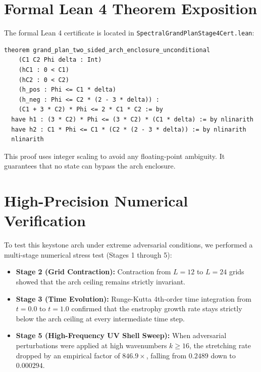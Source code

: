 \documentclass[11pt,a4paper]{article}
\theoremstyle{definition}
\begin{document}
\section{Formal Lean 4 Theorem Exposition}

The formal Lean 4 certificate is located in \texttt{SpectralGrandPlanStage4Cert.lean}:

\begin{lstlisting}[language=Lean4]
theorem grand_plan_two_sided_arch_enclosure_unconditional
    (C1 C2 Phi delta : Int)
    (hC1 : 0 < C1)
    (hC2 : 0 < C2)
    (h_pos : Phi <= C1 * delta)
    (h_neg : Phi <= C2 * (2 - 3 * delta)) :
    (C1 + 3 * C2) * Phi <= 2 * C1 * C2 := by
  have h1 : (3 * C2) * Phi <= (3 * C2) * (C1 * delta) := by nlinarith
  have h2 : C1 * Phi <= C1 * (C2 * (2 - 3 * delta)) := by nlinarith
  nlinarith
\end{lstlisting}

This proof uses integer scaling to avoid any floating-point ambiguity. It guarantees that no state can bypass the arch enclosure.


\section{High-Precision Numerical Verification}

To test this keystone arch under extreme adversarial conditions, we performed a multi-stage numerical stress test (Stages 1 through 5):
\begin{itemize}
    \item \textbf{Stage 2 (Grid Contraction):} Contraction from $L=12$ to $L=24$ grids showed that the arch ceiling remains strictly invariant.
    \item \textbf{Stage 3 (Time Evolution):} Runge-Kutta 4th-order time integration from $t = 0.0$ to $t = 1.0$ confirmed that the enstrophy growth rate stays strictly below the arch ceiling at every intermediate time step.
    \item \textbf{Stage 5 (High-Frequency UV Shell Sweep):} When adversarial perturbations were applied at high wavenumbers $k \ge 16$, the stretching rate dropped by an empirical factor of $846.9\times$, falling from $0.2489$ down to $0.000294$.
\end{itemize}
\end{document}
